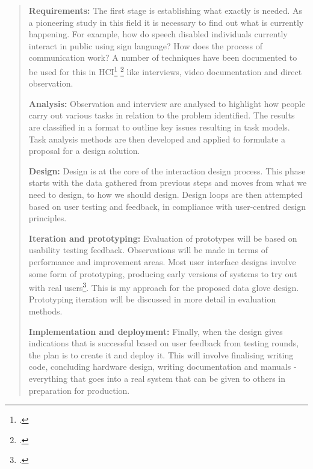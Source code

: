 \begin{quote}
\textbf{Requirements:} The first stage is establishing what exactly is needed. As a pioneering study in this field it is necessary to find out what is currently happening. For example, how do speech disabled individuals currently interact in public using sign language? How does the process of communication work? 
A number of techniques have been documented to be used for this in HCI\footcite{Dix2004} \footcite{Zimmerman:2007:RTD:1240624.1240704} like interviews, video documentation and direct observation.
 
\textbf{Analysis:} Observation and interview are analysed to highlight how people carry out various tasks in relation to the problem identified. The results are classified in a format to outline key issues resulting in task models. Task analysis methods are then developed and applied to formulate a proposal for a design solution. 

\textbf{Design:} Design is at the core of the interaction design process. This phase starts with the data gathered from previous steps and moves from what we need to design, to how we should design. Design loops are then attempted based on user testing and feedback, in compliance with user-centred design principles. 

\textbf{Iteration and prototyping:} Evaluation of prototypes will be based on usability testing feedback. Observations will be made in terms of performance and improvement areas. Most user interface designs involve some form of prototyping, producing early versions of systems to try out with real users\footcite{Bevan1999}. This is my approach for the proposed data glove design. Prototyping iteration will be discussed in more detail in evaluation methods. 

\textbf{Implementation and deployment:} Finally, when the design gives indications that is successful based on user feedback from testing rounds, the plan is to create it and deploy it. This will involve finalising writing code, concluding hardware design, writing documentation and manuals - everything that goes into a real system that can be given to others in preparation for production. 
\end{quote}
